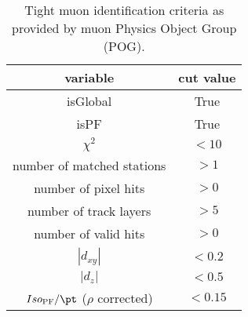 \begin{table}[ht]
    \centering
    \setlength{\tabcolsep}{4em}
    \renewcommand{\arraystretch}{1.25}
    \caption{Tight muon identification criteria as provided by muon Physics Object Group (POG). }
    \label{tab:analysis:selection:muon_id}
    \begin{tabular}{c|c}
    \hline
    variable                            & cut value \\
    \hline
    isGlobal                            & True      \\
    isPF                                & True      \\
    $\chi^{2}$                          & $< 10$    \\
    number of matched stations          & $> 1$     \\
    number of pixel hits                & $> 0$     \\
    number of track layers              & $> 5$     \\
    number of valid hits                & $> 0$     \\
    $|d_{xy}|$                          & $< 0.2$   \\
    $|d_{z}|$                           & $< 0.5$    \\
    \hline
    $Iso_\mathrm{PF}/\pt$ ($\rho$ corrected) & $< 0.15$ \\
    \hline
    \end{tabular}
\end{table}
